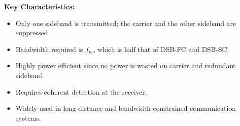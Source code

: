 \textbf{Key Characteristics:}

\begin{itemize}[itemsep=2pt]
    \item Only one sideband is transmitted; the carrier and the other sideband are suppressed.
    \item Bandwidth required is $f_m$, which is half that of DSB-FC and DSB-SC.
    \item Highly power efficient since no power is wasted on carrier and redundant sideband.
    \item Requires coherent detection at the receiver.
    \item Widely used in long-distance and bandwidth-constrained communication systems.
\end{itemize}
